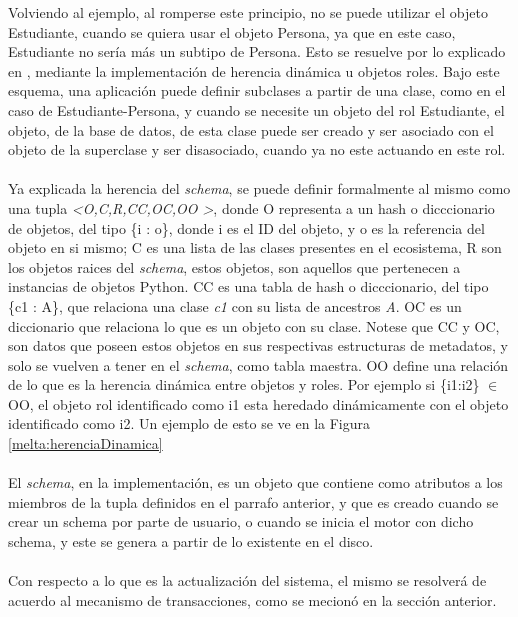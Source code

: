 \documentclass{melta}
\begin{document}
Volviendo al ejemplo, al romperse este principio, no se puede utilizar el objeto Estudiante, cuando se quiera usar el objeto Persona, ya que en este caso, Estudiante no sería más un subtipo de Persona. Esto se resuelve por lo explicado en \cite{OMG:oodbs}, mediante la implementación de herencia dinámica u objetos roles\cite{dynamic:Jodlowski}. Bajo este esquema, una aplicación puede definir subclases a partir de una clase, como en el caso de Estudiante-Persona, y cuando se necesite un objeto del rol Estudiante, el objeto, de la base de datos, de esta clase puede ser creado y ser asociado con el objeto de la superclase y ser disasociado, cuando ya no este actuando en este rol.
\\\\
Ya explicada la herencia del \textit{schema}, se puede definir formalmente al mismo como una tupla \newline \textit{\textless O,C,R,CC,OC,OO \textgreater}, donde O representa a un hash o dicccionario de objetos, del tipo \{i : o\}, donde i es el ID del objeto, y o es la referencia del objeto en si mismo; C es una lista de las clases presentes en el ecosistema, R son los objetos raices del \textit{schema}, estos objetos, son aquellos que pertenecen a instancias de objetos Python. CC es una tabla de hash o dicccionario, del tipo \{c1 : A\}, que relaciona una clase \textit{c1} con su lista de ancestros \textit{A}. OC es un diccionario que relaciona lo que es un objeto con su clase. Notese que CC y OC, son datos que poseen estos objetos en sus respectivas estructuras de metadatos, y solo se vuelven a tener en el \textit{schema}, como tabla maestra. OO define una relación de lo que es la herencia dinámica entre objetos y roles. Por ejemplo si \{i1:i2\} 
\begin{math}
 \in
\end{math} OO, el objeto rol identificado como i1 esta heredado dinámicamente con el objeto identificado como i2. Un ejemplo de esto se ve en la Figura \ref{melta:herenciaDinamica}
\\\\
El \textit{schema}, en la implementación, es un objeto que contiene como atributos a los miembros de la tupla definidos en el parrafo anterior, y que es creado cuando se crear un schema por parte de usuario, o cuando se inicia el motor con dicho schema, y este se genera a partir de lo existente en el disco.
\\\\
Con respecto a lo que es la actualización del sistema, el mismo se resolverá de acuerdo al mecanismo de transacciones, como se mecionó en la sección anterior. 
\end{document}
